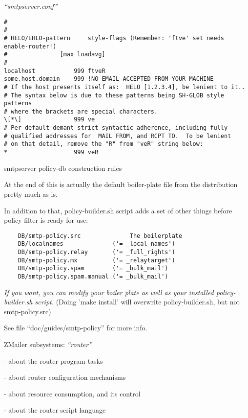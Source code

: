 \documentclass[a4paper,landscape]{slides}
\newcommand{\ZM}{ZMailer}
\begin{document}
\begin{overlay}
\small
\centerline{{\em ``smtpserver.conf''}}
\tiny
\begin{verbatim}
#
#
# HELO/EHLO-pattern     style-flags (Remember: 'ftve' set needs enable-router!)
#               [max loadavg]
#
localhost           999 ftveR
some.host.domain    999 !NO EMAIL ACCEPTED FROM YOUR MACHINE
# If the host presents itself as:  HELO [1.2.3.4], be lenient to it..
# The syntax below is due to these patterns being SH-GLOB style patterns
# where the brackets are special characters.
\[*\]               999 ve
# Per default demant strict syntactic adherence, including fully
# qualified addresses for  MAIL FROM, and RCPT TO.  To be lenient
# on that detail, remove the "R" from "veR" string below:
*                   999 veR

\end{verbatim}
\vfill
\end{overlay}

\begin{overlay}
\centerline{smtpserver policy-db construction rules}

\small
At the end of this is actually the default boiler-plate file from
the distribution pretty much as is.

In addition to that, policy-builder.sh script adds a set of other
things before policy filter is ready for use:
\begin{verbatim}
    DB/smtp-policy.src              The boilerplate
    DB/localnames              ('= _local_names')
    DB/smtp-policy.relay       ('= _full_rights')
    DB/smtp-policy.mx          ('= _relaytarget')
    DB/smtp-policy.spam        ('= _bulk_mail')
    DB/smtp-policy.spam.manual ('= _bulk_mail')
\end{verbatim}

{\em If you want, you can modify your boiler plate as well as your
installed policy-builder.sh script.}  (Doing 'make install' will
overwrite policy-builder.sh, but not  smtp-policy.src)

See file ``doc/guides/smtp-policy'' for more info.

\vfill

\end{overlay}



\begin{slide}

\centerline{\large \ZM{} subsystems: {\em ``router''}}

- about the router program tasks

- about router configuration mechanisms

- about resource consumption, and its control

- about the router script language


\vfill
\end{slide}
\end{document}
